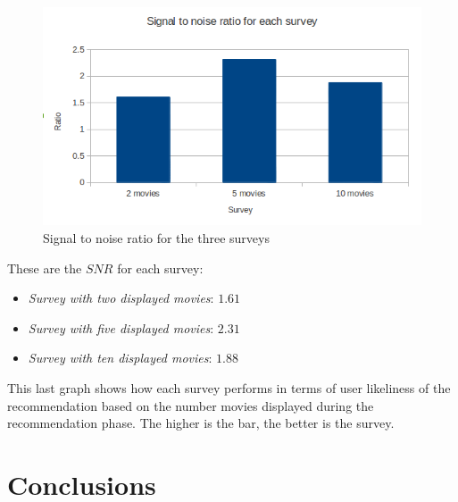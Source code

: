 \begin{figure}
  \centering
  \includegraphics[width=\textwidth]{figures/research_signal_to_noise_ratio.png}
  \caption{Signal to noise ratio for the three surveys}
  \label{fig:research_signal_to_noise}
\end{figure}

These are the
\begin{math}
  SNR
\end{math}
for each survey:
\begin{itemize}
\item \textit{Survey with two displayed movies}: \begin{math}1.61\end{math}
\item \textit{Survey with five displayed movies}: \begin{math}2.31\end{math}
\item \textit{Survey with ten displayed movies}: \begin{math}1.88\end{math}
\end{itemize}

This last graph shows how each survey performs in terms of user likeliness of the recommendation based on the number movies displayed during the recommendation phase. The higher is the bar, the better is the survey.

\section{Conclusions}
\label{sec:research_conclusions}

